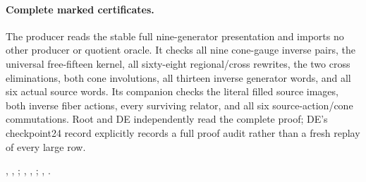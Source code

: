 \paragraph{Complete marked certificates.}
The producer reads the stable full nine-generator presentation and
imports no other producer or quotient oracle. It checks all nine
cone-gauge inverse pairs, the universal free-fifteen kernel, all
sixty-eight regional/cross rewrites, the two cross eliminations,
both cone involutions, all thirteen inverse generator words, and
all six actual source words. Its companion checks the literal filled
source images, both inverse fiber actions, every surviving relator,
and all six source-action/cone commutations. Root and DE independently
read the complete proof; DE's checkpoint24 record explicitly records
a full proof audit rather than a fresh replay of every large row.
\begingroup\raggedright
{},
,
;
,
,
;
,
.
\par\endgroup
